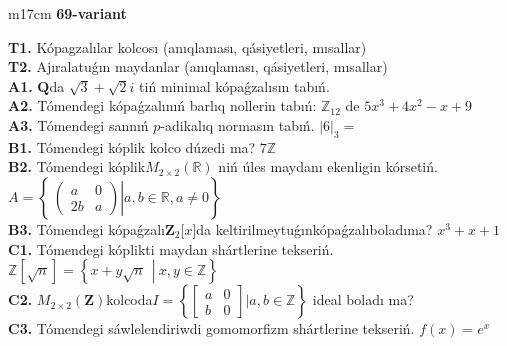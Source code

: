 \documentclass{article}
\begin{document}
\begin{tabular}{m{17cm}}
\textbf{69-variant}
\newline

\textbf{T1.} Kópagzalılar kolcosı (anıqlaması, qásiyetleri, mısallar) \\
\textbf{T2.} Ajıralatuǵın maydanlar (anıqlaması, qásiyetleri, mısallar) \\
\textbf{A1.} \(\mathbf{Q}\)da \(\sqrt{3} + \sqrt{2}i\) tiń minimal kópaǵzalısın tabıń. \\
\textbf{A2.} Tómendegi kópaǵzalınıń barlıq nollerin tabıń: \(\mathbb{Z}_{12}\) de \(5x^{3} + 4x^{2} - x + 9\) \\
\textbf{A3.} Tómendegi sannıń \(p\)-adikalıq normasın tabıń. \(|6|_{3} =\) \\
\textbf{B1.} Tómendegi kóplik kolco dúzedi ma? \(7\mathbb{Z}\) \\
\textbf{B2.} Tómendegi kóplik\(M_{2 \times 2}\left( \mathbb{R} \right)\) niń úles maydanı ekenligin kórsetiń. \(A = \left\{ \left. \ \begin{pmatrix}
a & 0 \\
2b & a
\end{pmatrix} \right|a,b\mathbb{\in R},a \neq 0 \right\}\) \\
\textbf{B3.} Tómendegi kópaǵzalı\(\mathbf{Z}_{2}\lbrack x\rbrack\)da keltirilmeytuǵınkópaǵzalıboladıma? \(x^{3} + x + 1\) \\
\textbf{C1.} Tómendegi kóplikti maydan shártlerine tekseriń. \(\mathbb{Z}\left\lbrack \sqrt{n} \right\rbrack = \left\{ x + y\sqrt{n}\ \ \left| \right.\ x,y \in \mathbb{Z} \right\}\) \\
\textbf{C2.} \(M_{2 \times 2}\left( \mathbf{Z} \right)\)kolcoda\(I = \left\{ \begin{bmatrix}
a & 0 \\
b & 0
\end{bmatrix}|a,b\mathbb{\in Z} \right\}\) ideal boladı ma? \\
\textbf{C3.} Tómendegi sáwlelendiriwdi gomomorfizm shártlerine tekseriń. \(f(x) = e^{x}\) \\

\end{tabular}
\vspace{1cm}
\end{document}
